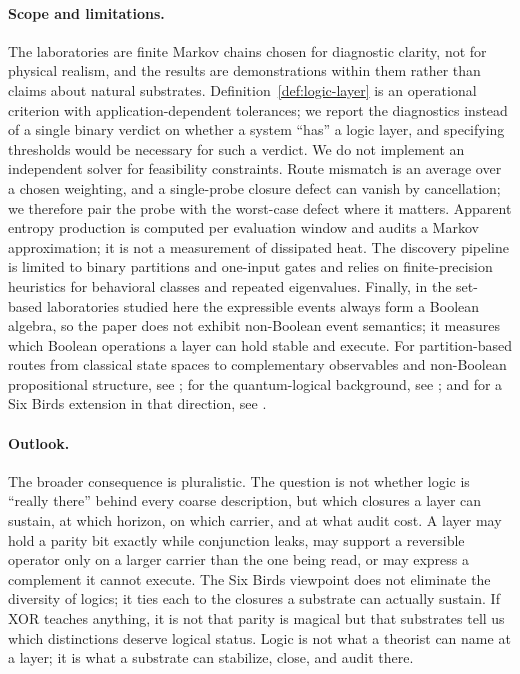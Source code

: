 \paragraph{Scope and limitations.}
The laboratories are finite Markov chains chosen for diagnostic clarity, not for physical realism, and the results are demonstrations within them rather than claims about natural substrates. Definition~\ref{def:logic-layer} is an operational criterion with application-dependent tolerances; we report the diagnostics instead of a single binary verdict on whether a system ``has'' a logic layer, and specifying thresholds would be necessary for such a verdict. We do not implement an independent solver for feasibility constraints. Route mismatch is an average over a chosen weighting, and a single-probe closure defect can vanish by cancellation; we therefore pair the probe with the worst-case defect where it matters. Apparent entropy production is computed per evaluation window and audits a Markov approximation; it is not a measurement of dissipated heat. The discovery pipeline is limited to binary partitions and one-input gates and relies on finite-precision heuristics for behavioral classes and repeated eigenvalues. Finally, in the set-based laboratories studied here the expressible events always form a Boolean algebra, so the paper does not exhibit non-Boolean event semantics; it measures which Boolean operations a layer can hold stable and execute. For partition-based routes from classical state spaces to complementary observables and non-Boolean propositional structure, see \cite{ellerman2010partitions,atmanspacher2015nonboolean}; for the quantum-logical background, see \cite{birkhoff1936quantumlogic}; and for a Six Birds extension in that direction, see \cite{tsiokos2026quantum}.

\paragraph{Outlook.}
The broader consequence is pluralistic. The question is not whether logic is ``really there'' behind every coarse description, but which closures a layer can sustain, at which horizon, on which carrier, and at what audit cost. A layer may hold a parity bit exactly while conjunction leaks, may support a reversible operator only on a larger carrier than the one being read, or may express a complement it cannot execute. The Six Birds viewpoint does not eliminate the diversity of logics; it ties each to the closures a substrate can actually sustain. If XOR teaches anything, it is not that parity is magical but that substrates tell us which distinctions deserve logical status. Logic is not what a theorist can name at a layer; it is what a substrate can stabilize, close, and audit there.
